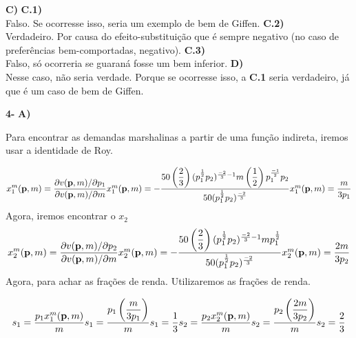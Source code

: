 \begin{flushleft}
\singlespacing

\textbf{C)} 
\singlespacing
\textbf{C.1)}
\\
Falso. Se ocorresse isso, seria um exemplo de bem de Giffen.
\singlespacing
\textbf{C.2)}
\\
Verdadeiro. Por causa do efeito-substituição que é sempre negativo (no caso de preferências bem-comportadas, negativo).
\singlespacing
\textbf{C.3)}
\\
Falso, só ocorreria se guaraná fosse um bem inferior.
\singlespacing
\textbf{D)}
\\
Nesse caso, não seria verdade. Porque se ocorresse isso, a \textbf{C.1} seria verdadeiro, já que é um caso de bem de Giffen. 
\singlespacing

\textbf{4-}
\singlespacing
\textbf{A)}
\singlespacing

Para encontrar as demandas marshalinas a partir de uma função indireta, iremos usar a identidade de Roy.

\begin{equation}
x_{1}^{m}(\textbf{p},m) = \dfrac{ \partial v(\textbf{p},m) / \partial p_{1}}{\partial v(\textbf{p},m)/\partial m}
$$\\$$
x_{1}^{m}(\textbf{p},m) = - \dfrac{ 50 \left(\dfrac{2}{3}\right)(p_{1}^{\frac{1}{2}}p_{2})^{\frac{-2}{3}-1}m\left(\dfrac{1}{2}\right)p_{1}^{\frac{-1}{2}}p_{2}}{50(p_{1}^{\frac{1}{2}}{p_{2}})^{\frac{-2}{3}}}
$$\\$$
x_{1}^{m}(\textbf{p},m) = \dfrac{m}{3p_{1}}
\end{equation}
Agora, iremos encontrar o $x_{2}$
\begin{equation}
x_{2}^{m}(\textbf{p},m) = \dfrac{ \partial v(\textbf{p},m) / \partial p_{2}}{\partial v(\textbf{p},m)/\partial m}
$$\\$$
x_{2}^{m}(\textbf{p},m) = - \dfrac{50 \left(\dfrac{2}{3} \right) (p_{1}^{\frac{1}{2}}p_{2})^{\frac{-2}{3}-1} mp_{1}^{\frac{1}{2}} }{50(p_{1}^{\frac{1}{2}}p_{2})^{\frac{-2}{3}}}
$$\\$$
x_{2}^{m}(\textbf{p},m) = \dfrac{2m}{3p_{2}}
\end{equation}
Agora, para achar as frações de renda. Utilizaremos as frações de renda.

\begin{equation}
s_{1} = \dfrac{p_{1}x_{1}^{m}(\textbf{p},m)}{m}
$$\\$$
s_{1} = \dfrac{p_{1}\left(\dfrac{m}{3p_{1}}\right)}{m}
$$\\$$
s_{1} = \dfrac{1}{3}
$$\\$$
s_{2} = \dfrac{p_{2}x_{2}^{m}(\textbf{p},m)}{m}
$$\\$$
s_{2} = \dfrac{p_{2}\left(\dfrac{2m}{3p_{2}}\right)}{m}
$$\\$$
$$\\$$
s_{2} = \dfrac{2}{3}
\end{equation}
\singlespacing
\begin{center}

\end{center}
\end{flushleft}
